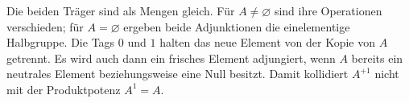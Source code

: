 Die beiden Träger sind als Mengen gleich. Für \(A\neq\varnothing\)
sind ihre Operationen verschieden; für \(A=\varnothing\) ergeben beide
Adjunktionen die einelementige Halbgruppe.
Die Tags \(0\) und \(1\) halten das neue Element von der Kopie von \(A\)
getrennt. Es wird auch dann ein frisches Element adjungiert, wenn \(A\)
bereits ein neutrales Element beziehungsweise eine Null besitzt.
Damit kollidiert \(A^{+1}\) nicht mit der Produktpotenz \(A^1=A\).

